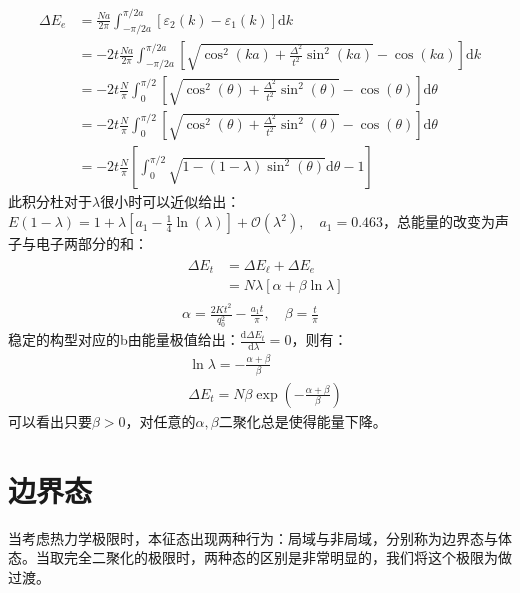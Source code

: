 \documentclass[12pt, a4paper, oneside]{ctexbook}
\begin{document}
\begin{equation}
	\begin{aligned}
		\Delta E_e & =\frac{N a}{2 \pi} \int_{-\pi / 2 a}^{\pi / 2 a}\left[\varepsilon_2(k)-\varepsilon_1(k)\right] \mathrm{d} k \\
		& =-2 t \frac{N a}{2 \pi} \int_{-\pi / 2 a}^{\pi / 2 a}\left[\sqrt{\cos ^2(k a)+\frac{\Delta^2}{t^2} \sin ^2(k a)}-\cos (k a)\right] \mathrm{d} k \\
		& =-2 t \frac{N}{\pi} \int_0^{\pi / 2}\left[\sqrt{\cos ^2(\theta)+\frac{\Delta^2}{t^2} \sin ^2(\theta)}-\cos (\theta)\right] \mathrm{d} \theta \\
		& =-2 t \frac{N}{\pi} \int_0^{\pi / 2}\left[\sqrt{\cos ^2(\theta)+\frac{\Delta^2}{t^2} \sin ^2(\theta)}-\cos (\theta)\right] \mathrm{d} \theta \\
		& =-2 t \frac{N}{\pi}\left[\int_0^{\pi / 2} \sqrt{1-(1-\lambda) \sin ^2(\theta)} \mathrm{d} \theta-1\right]
		\end{aligned}
\end{equation}
此积分杜对于$ \lambda $很小时可以近似给出：$ E(1-\lambda)=1+\lambda\left[a_1-\frac{1}{4} \ln (\lambda)\right]+\mathcal{O}\left(\lambda^2\right), \quad a_1=0.463 $，总能量的改变为声子与电子两部分的和：  
\begin{equation}
	\begin{aligned}
		&\begin{aligned}
		\Delta E_t & =\Delta E_{\ell}+\Delta E_e \\
		& =N \lambda[\alpha+\beta \ln \lambda]
		\end{aligned}\\
		&\alpha=\frac{2 K t^2}{q_0^2}-\frac{a_1 t}{\pi}, \quad \beta=\frac{t}{\pi}
		\end{aligned}
\end{equation}
稳定的构型对应的b由能量极值给出：$ \frac{\mathrm{d} \Delta E_t}{\mathrm{~d} \lambda}=0 $，则有：
\begin{equation}
	\begin{aligned}
		& \ln \lambda=-\frac{\alpha+\beta}{\beta} \\
		& \Delta E_t=N \beta \exp \left(-\frac{\alpha+\beta}{\beta}\right)
		\end{aligned}
\end{equation} 
可以看出只要$ \beta>0 $，对任意的$ \alpha,\beta $二聚化总是使得能量下降。  
\section{边界态}
当考虑热力学极限时，本征态出现两种行为：局域与非局域，分别称为边界态与体态。当取完全二聚化的极限时，两种态的区别是非常明显的，我们将这个极限为做过渡。\\
\end{document}
